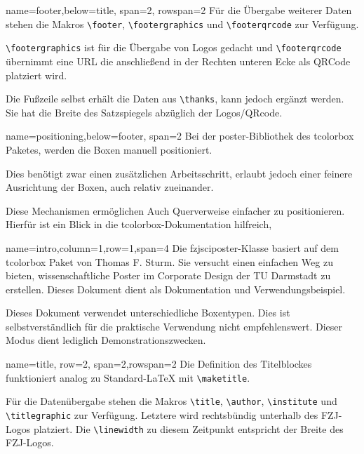 \documentclass[
	accentcolor=9c,
	logofile=example-image, %
	]{fzjsciposter}
\newcommand{\tbs}{\textbackslash}
\let\code\texttt
\newcommand*{\macro}[1]{\code{\tbs#1}}
\let\pck\textsf
\let\cls\textsf
\begin{document}
\begin{tcbposter}[
	poster={
		columns=4,
		rows=7,
		spacing=1cm,
	},]
\begin{posterboxenv}[title=Fußzeile]{name=footer,below=title, span=2, rowspan=2 }
	Für die Übergabe weiterer Daten stehen die Makros \macro{footer}, \macro{footergraphics} und \macro{footerqrcode} zur Verfügung.
	
	\macro{footergraphics} ist für die Übergabe von Logos gedacht und \macro{footerqrcode} übernimmt eine URL die anschließend in der Rechten unteren Ecke als QRCode platziert wird.
	
	Die Fußzeile selbst erhält die Daten aus \macro{thanks}, kann jedoch ergänzt werden. Sie hat die Breite des Satzspiegels abzüglich der Logos/QRcode.
\end{posterboxenv}


\begin{posterboxenv}[title=Platzierung der Boxen]{name=positioning,below=footer, span=2}
Bei der \pck{poster}-Bibliothek des \pck{tcolorbox} Paketes, werden die Boxen manuell positioniert. 

Dies benötigt zwar einen zusätzlichen Arbeitsschritt, erlaubt jedoch einer feinere Ausrichtung der Boxen, auch relativ zueinander. 

Diese Mechanismen ermöglichen Auch Querverweise einfacher zu positionieren. Hierfür ist ein Blick in die \pck{tcolorbox}-Dokumentation hilfreich,
\end{posterboxenv}
	
\begin{posterboxenv}[title=Zusammenfassung]{name=intro,column=1,row=1,span=4}
	Die \cls{fzjsciposter}-Klasse basiert auf dem \pck{tcolorbox} Paket von Thomas F. Sturm.
	Sie versucht einen einfachen Weg zu bieten, wissenschaftliche Poster im Corporate Design der TU Darmstadt zu erstellen. Dieses Dokument dient als Dokumentation und Verwendungsbeispiel.
	
	Dieses Dokument verwendet unterschiedliche Boxentypen. Dies ist selbstverständlich für die praktische Verwendung nicht empfehlenswert. Dieser Modus dient lediglich Demonstrationszwecken.
\end{posterboxenv}

\begin{posterboxenv}[title=Titelei]{name=title, row=2, span=2,rowspan=2}
	Die Definition des Titelblockes funktioniert analog zu Standard-\LaTeX{} mit \macro{maketitle}.
	
	Für die Datenübergabe stehen die Makros \macro{title}, \macro{author}, \macro{institute} und \macro{titlegraphic} zur Verfügung. Letztere wird rechtsbündig  unterhalb des FZJ-Logos platziert. Die \macro{linewidth} zu diesem Zeitpunkt entspricht der Breite des FZJ-Logos.
	

\end{posterboxenv}
\end{tcbposter}
\end{document}
